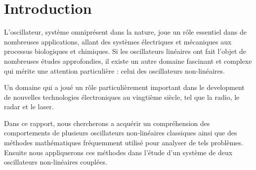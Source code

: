 \chapter{Introduction}
L'oscillateur, système omniprésent dans la nature, 
joue un rôle essentiel dans de nombreuses applications, 
allant des systèmes électriques et mécaniques aux processus biologiques et 
chimiques. Si les oscillateurs linéaires ont fait l'objet de nombreuses 
études approfondies, il existe un autre domaine fascinant et complexe qui 
mérite une attention particulière : celui des oscillateurs non-linéaires. 

Un domaine qui a joué un rôle particulièrement important dans le development 
de nouvelles technologies électroniques au vingtième siècle, tel que la radio, 
le radar et le laser.

Dans ce rapport, nous chercherons a acquérir un compréhension des 
comportements de plusieurs oscillateurs non-linéaires classiques ainsi que 
des méthodes mathématiques fréquemment utilisé pour analyser de tels problèmes. 
Ensuite nous appliquerons ces méthodes dans l'étude d'un système 
de deux oscillateurs non-linéaires couplées.
